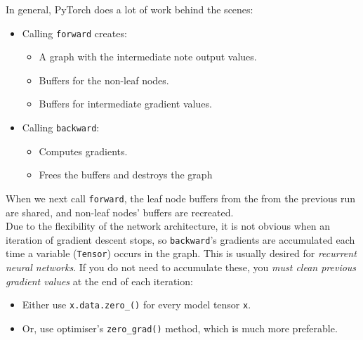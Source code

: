\newpage
In general, PyTorch does a lot of work behind the scenes:
\begin{itemize}
\item Calling \texttt{forward} creates:
\begin{itemize}
\item A graph with the intermediate note output values.
\item Buffers for the non-leaf nodes.
\item Buffers for intermediate gradient values.
\end{itemize}
\item Calling \texttt{backward}:
\begin{itemize}
\item Computes gradients.
\item Frees the buffers and destroys the graph
\end{itemize}
\end{itemize}
When we next call \texttt{forward}, the leaf node buffers from the from the previous run are shared, and non-leaf nodes' buffers are recreated. \\

Due to the flexibility of the network architecture, it is not obvious when an iteration of gradient descent stops, so \texttt{backward}'s gradients are accumulated each time a variable (\texttt{Tensor}) occurs in the graph. This is usually desired for \textit{recurrent neural networks}. If you do not need to accumulate these, you \textit{must clean previous gradient values} at the end of each iteration:
\begin{itemize}
\item Either use \texttt{x.data.zero\_()} for every model tensor \texttt{x}.
\item Or, use optimiser's \texttt{zero\_grad()} method, which is much more preferable.
\end{itemize}

